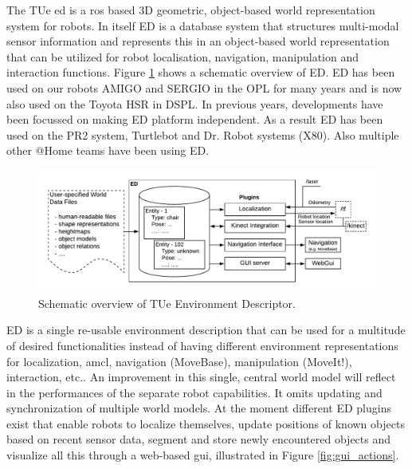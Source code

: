 The TUe \acrfull{ed} is a \acrfull{ros} based 3D geometric, object-based world representation system for robots. In itself ED is a database system that structures multi-modal sensor information and represents this in an object-based world representation that can be utilized for robot localisation, navigation, manipulation and interaction functions. Figure \ref{fig:ed} shows a schematic overview of ED.
ED has been used on our robots AMIGO and SERGIO in the OPL for many years and is now also used on the Toyota HSR in DSPL. In previous years, developments have been focussed on making ED platform independent. As a result ED has been used on the PR2 system, Turtlebot and Dr. Robot systems (X80). Also multiple other @Home teams have been using ED.
\begin{figure}[h]
	\includegraphics[width = 0.9\linewidth]{Figures/ed_overview}
	\caption{Schematic overview of TUe Environment Descriptor.}
	\label{fig:ed}
\end{figure}
ED is a single re-usable environment description that can be used for a multitude of desired functionalities instead of having different environment representations for localization, \acrfull{amcl}, navigation (MoveBase), manipulation (MoveIt!), interaction, etc.. An improvement in this single, central world model will reflect in the performances of the separate robot capabilities. It omits updating and synchronization of multiple world models. At the moment different ED plugins exist that enable robots to localize themselves, update positions of known objects based on recent sensor data, segment and store newly encountered objects and visualize all this through a web-based \acrshort{gui}, illustrated in Figure \ref{fig:gui_actions}.
